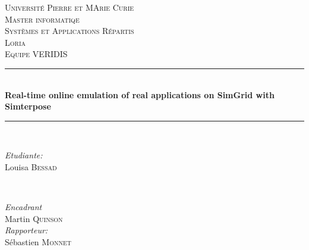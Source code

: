 \documentclass[a4paper,11pt]{article}
\begin{document}
\begin{titlepage}

\newcommand{\HRule}{\rule{\linewidth}{0.5mm}} %

\center %
 

\textsc{\LARGE Université Pierre et MArie Curie}\\[0.44cm] %
\textsc{\Large Master informatiqe}\\[0.44cm] %
\textsc{\large Systèmes et Applications Répartis}\\[1.44cm] %

\textsc{\LARGE Loria}\\[0.44cm] %
\textsc{\Large Equipe VERIDIS}\\[1.44cm] %


\HRule \\[0.4cm]
{ \huge \bfseries Real-time online emulation of real applications on SimGrid with Simterpose}\\[0.4cm] %
\HRule \\[1.44cm]
 

\begin{minipage}{0.4\textwidth}
\begin{flushleft} \large
\emph{Etudiante:}\\
Louisa \textsc{Bessad} %
\end{flushleft}
\end{minipage}
~
\begin{minipage}{0.4\textwidth}
\begin{flushright} \large
\emph{Encadrant} \\
Martin \textsc{Quinson} %
\\\vspace{1.44cm} \emph{Rapporteur:} \\ Sébastien
\textsc{Monnet}
\end{flushright}
\end{minipage}\\[1.5cm]


\end{titlepage}
\end{document}
